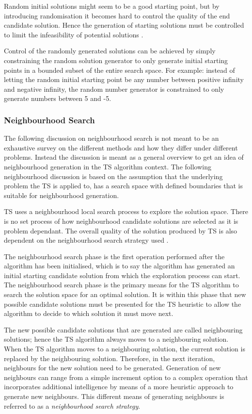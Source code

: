 Random initial solutions might seem to be a good starting point, but by introducing randomisation it becomes hard to control the quality of the end candidate solution\cite{TSHazardous}. Hence the generation of starting solutions must be controlled to limit the infeasibility of potential solutions \cite{TSHazardous}. 

Control of the randomly generated solutions can be achieved by simply constraining the random solution generator to only generate initial starting points in a bounded subset of the entire search space. For example: instead of letting the random initial starting point be any number between positive infinity and negative infinity, the random number generator is constrained to only generate numbers between 5 and -5.

\subsubsection{Neighbourhood Search}
The following discussion on neighbourhood search is not meant to be an exhaustive survey on the different methods and how they differ under different problems. Instead the discussion is meant as a general overview to get an idea of neighbourhood generation in the \gls{TS} algorithm context. The following neighbourhood discussion is based on the assumption that the underlying problem the \gls{TS} is applied to, has a search space with defined boundaries that is suitable for neighbourhood generation.

TS uses a neighbourhood local search process to explore the solution space. There is no set process of how neighbourhood candidate solutions are selected as it is problem dependant. The overall quality of the solution produced by \gls{TS} is also dependent on the neighbourhood search strategy used \cite{TSHazardous}. 

The neighbourhood search phase is the first operation performed after the algorithm has been initialised, which is to say the algorithm has generated an initial starting candidate solution from which the exploration process can start. The neighbourhood search phase is the primary means for the \gls{TS} algorithm to search the solution space for an optimal solution. It is within this phase that new possible candidate solutions must be presented for the \gls{TS} heuristic to allow the algorithm to decide to which solution it must move next.

The new possible candidate solutions that are generated are called neighbouring solutions; hence the \gls{TS} algorithm always moves to a neighbouring solution. When the \gls{TS} algorithm moves to a neighbouring solution, the current solution is replaced by the neighbouring solution. Therefore, in the next iteration, neighbours for the new solution need to be generated. Generation of new neighbours can range from a simple increment option to a complex operation that incorporates additional intelligence by means of a more heuristic approach to generate new neighbours. This different means of generating neighbours is referred to as a \emph{neighbourhood search strategy}.


